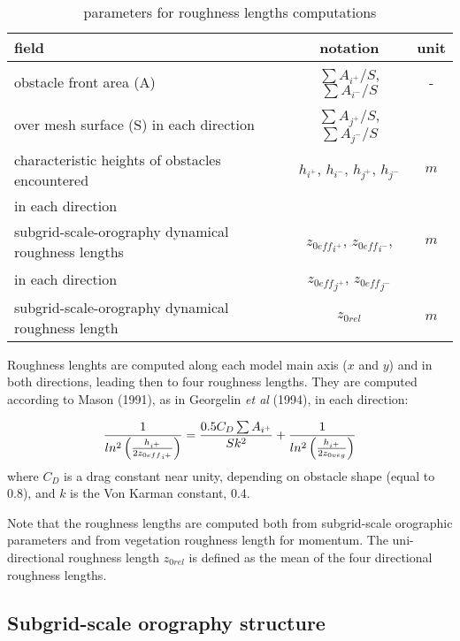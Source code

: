 \begin{table}[h]
\hspace*{0.cm}
\begin{tabular}{||l|c|c||}
\hline
\hline
field & notation &  unit \\
\hline
\hline
obstacle front area (A) & $\sum A_{i^+}/S$, $\sum A_{i^-}/S$ & -\\
over mesh surface (S) in each direction&$\sum A_{j^+}/S$, $\sum A_{j^-}/S$& \\
\hline
characteristic heights of obstacles encountered &
 $h_{i^+}$, $h_{i^-}$, $h_{j^+}$, $h_{j^-}$& $m$\\
in each direction &&\\
\hline
\hline
subgrid-scale-orography  dynamical roughness lengths &
${z_{0eff}}_{i^+}$, ${z_{0eff}}_{i^-}$,& $m$\\
in each direction &
${z_{0eff}}_{j^+}$,
${z_{0eff}}_{j^-}$&\\
\hline
subgrid-scale-orography dynamical roughness length & $z_{0rel}$& $m$\\
\hline
\hline
\end{tabular}
\caption{parameters for roughness lengths computations
\label{paramZ0}}
\end{table}

Roughness lenghts are computed along each model main axis ($x$ and $y$)
and in both directions, leading then to four roughness lengths.
They are computed according to Mason (1991), as in Georgelin {\it et al} (1994),
in each direction:

\begin{equation}
\frac{1}{ln^2\left( \frac{h_{i^+}}{2{z_{0eff}}_{i^+}} \right)} = \frac{0.5 C_D \sum
A_{i^+}}{S k^2}
+ \frac{1}{ln^2\left( \frac{h_{i^+}}{2z_{0veg}} \right)}
\end{equation}
where $C_D$ is a drag constant near unity, depending on obstacle shape
(equal to 0.8), and $k$ is the Von Karman constant, 0.4.

Note that the roughness lengths are computed both from subgrid-scale orographic
parameters and from vegetation roughness length for momentum.
The uni-directional roughness length $z_{0rel}$ is defined as the mean
of the four directional roughness lengths.


\subsection{Subgrid-scale orography structure}

